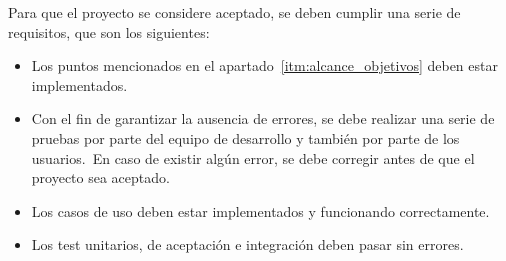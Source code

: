 Para que el proyecto se considere aceptado, se deben cumplir una serie de requisitos, que son los siguientes:

\begin{itemize}
	\item Los puntos mencionados en el apartado~\ref{itm:alcance_objetivos} deben estar implementados.
	\item Con el fin de garantizar la ausencia de errores, se debe realizar una serie de pruebas por parte del equipo
	de desarrollo y también por parte de los usuarios.\ En caso de existir algún error, se debe corregir antes de
	que el proyecto sea aceptado.
	\item Los casos de uso deben estar implementados y funcionando correctamente.
	\item Los test unitarios, de aceptación e integración deben pasar sin errores.
\end{itemize}
\label{itm:alcance_criterios_aceptación}

